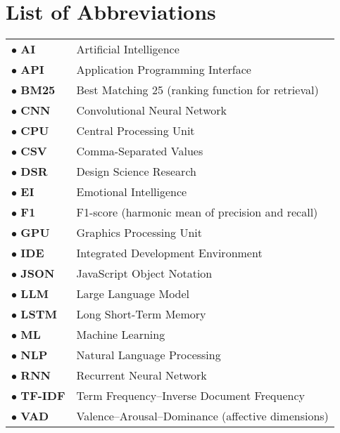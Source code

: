 \chapter*{List of Abbreviations}
\thispagestyle{plain}

\begin{tabular}{p{3cm}p{10cm}}
$\bullet$ \textbf{AI} & Artificial Intelligence \\
$\bullet$ \textbf{API} & Application Programming Interface \\
$\bullet$ \textbf{BM25} & Best Matching 25 (ranking function for retrieval) \\
$\bullet$ \textbf{CNN} & Convolutional Neural Network \\
$\bullet$ \textbf{CPU} & Central Processing Unit \\
$\bullet$ \textbf{CSV} & Comma-Separated Values \\
$\bullet$ \textbf{DSR} & Design Science Research \\
$\bullet$ \textbf{EI} & Emotional Intelligence \\
$\bullet$ \textbf{F1} & F1-score (harmonic mean of precision and recall) \\
$\bullet$ \textbf{GPU} & Graphics Processing Unit \\
$\bullet$ \textbf{IDE} & Integrated Development Environment \\
$\bullet$ \textbf{JSON} & JavaScript Object Notation \\
$\bullet$ \textbf{LLM} & Large Language Model \\
$\bullet$ \textbf{LSTM} & Long Short-Term Memory \\
$\bullet$ \textbf{ML} & Machine Learning \\
$\bullet$ \textbf{NLP} & Natural Language Processing \\
$\bullet$ \textbf{RNN} & Recurrent Neural Network \\
$\bullet$ \textbf{TF-IDF} & Term Frequency–Inverse Document Frequency \\
$\bullet$ \textbf{VAD} & Valence–Arousal–Dominance (affective dimensions) \\
\end{tabular}